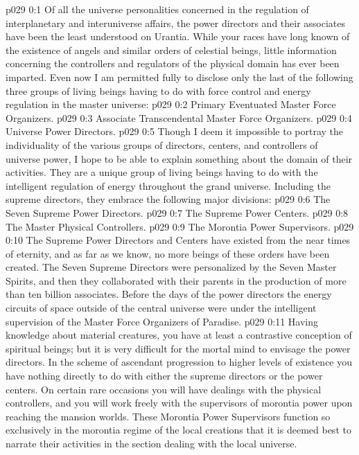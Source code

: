\author{Universal Censor}
\vs p029 0:1 Of all the universe personalities concerned in the regulation of interplanetary and interuniverse affairs, the power directors and their associates have been the least understood on Urantia. While your races have long known of the existence of angels and similar orders of celestial beings, little information concerning the controllers and regulators of the physical domain has ever been imparted. Even now I am permitted fully to disclose only the last of the following three groups of living beings having to do with force control and energy regulation in the master universe:
\pc \vs p029 0:2 \bibnobreakspace Primary Eventuated Master Force Organizers.
\vs p029 0:3 \bibnobreakspace Associate Transcendental Master Force Organizers.
\vs p029 0:4 \bibnobreakspace Universe Power Directors.
\pc \vs p029 0:5 Though I deem it impossible to portray the individuality of the various groups of directors, centers, and controllers of universe power, I hope to be able to explain something about the domain of their activities. They are a unique group of living beings having to do with the intelligent regulation of energy throughout the grand universe. Including the supreme directors, they embrace the following major divisions:
\pc \vs p029 0:6 \bibnobreakspace The Seven Supreme Power Directors.
\vs p029 0:7 \bibnobreakspace The Supreme Power Centers.
\vs p029 0:8 \bibnobreakspace The Master Physical Controllers.
\vs p029 0:9 \bibnobreakspace The Morontia Power Supervisors.
\pc \vs p029 0:10 The Supreme Power Directors and Centers have existed from the near times of eternity, and as far as we know, no more beings of these orders have been created. The Seven Supreme Directors were personalized by the Seven Master Spirits, and then they collaborated with their parents in the production of more than ten billion associates. Before the days of the power directors the energy circuits of space outside of the central universe were under the intelligent supervision of the Master Force Organizers of Paradise.
\vs p029 0:11 Having knowledge about material creatures, you have at least a contrastive conception of spiritual beings; but it is very difficult for the mortal mind to envisage the power directors. In the scheme of ascendant progression to higher levels of existence you have nothing directly to do with either the supreme directors or the power centers. On certain rare occasions you will have dealings with the physical controllers, and you will work freely with the supervisors of morontia power upon reaching the mansion worlds. These Morontia Power Supervisors function so exclusively in the morontia regime of the local creations that it is deemed best to narrate their activities in the section dealing with the local universe.\plusone
